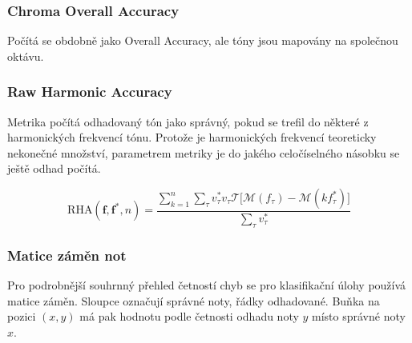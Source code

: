 \subsubsection{Chroma Overall Accuracy}

Počítá se obdobně jako Overall Accuracy, ale tóny jsou mapovány na společnou oktávu.

\subsubsection{Raw Harmonic Accuracy}

Metrika počítá odhadovaný tón jako správný, pokud se trefil do některé z harmonických frekvencí tónu. Protože je harmonických frekvencí teoreticky nekonečné množství, parametrem metriky je do jakého celočíselného násobku se ještě odhad počítá.

    $$\mathrm{RHA}(\mathbf{f}, \mathbf{f^*}, n) = \frac{\sum_{k=1}^n \sum_\tau{v^*_\tau v_\tau \mathcal{T}[\mathcal{M}(f_\tau) - \mathcal{M}(k f^*_\tau)} ] }{\sum_\tau{v^*_\tau}}$$

\subsubsection{Matice záměn not}

Pro podrobnější souhrnný přehled četností chyb se pro klasifikační úlohy používá matice záměn. Sloupce označují správné noty, řádky odhadované. Buňka na pozici $(x,y)$ má pak hodnotu podle četnosti odhadu noty $y$ místo správné noty $x$.





